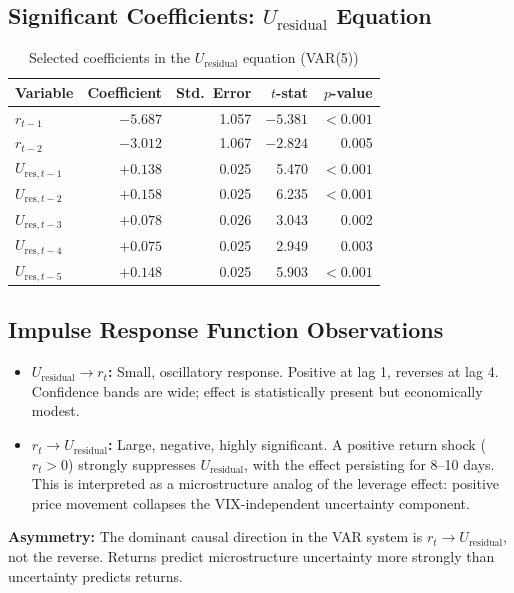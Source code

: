 \documentclass[preprint,12pt]{elsarticle}
\begin{document}
\subsection{Significant Coefficients: \texorpdfstring{$U_\mathrm{residual}$}{U\_residual} Equation}

\begin{table}[htbp]
\centering
\caption{Selected coefficients in the $U_\mathrm{residual}$ equation (VAR(5))}
\begin{tabular}{lrrrr}
\toprule
Variable & Coefficient & Std.\ Error & $t$-stat & $p$-value \\
\midrule
$r_{t-1}$ & $-5.687$ & 1.057 & $-5.381$ & $<0.001$ \\
$r_{t-2}$ & $-3.012$ & 1.067 & $-2.824$ & 0.005 \\
$U_{\mathrm{res}, t-1}$ & $+0.138$ & 0.025 & 5.470 & $<0.001$ \\
$U_{\mathrm{res}, t-2}$ & $+0.158$ & 0.025 & 6.235 & $<0.001$ \\
$U_{\mathrm{res}, t-3}$ & $+0.078$ & 0.026 & 3.043 & 0.002 \\
$U_{\mathrm{res}, t-4}$ & $+0.075$ & 0.025 & 2.949 & 0.003 \\
$U_{\mathrm{res}, t-5}$ & $+0.148$ & 0.025 & 5.903 & $<0.001$ \\
\bottomrule
\end{tabular}
\end{table}

\subsection{Impulse Response Function Observations}

\begin{itemize}
    \item \textbf{$U_\mathrm{residual} \to r_t$:} Small, oscillatory response. Positive at lag 1, reverses at lag 4. Confidence bands are wide; effect is statistically present but economically modest.
    \item \textbf{$r_t \to U_\mathrm{residual}$:} Large, negative, highly significant. A positive return shock ($r_t > 0$) strongly suppresses $U_\mathrm{residual}$, with the effect persisting for 8--10 days. This is interpreted as a microstructure analog of the leverage effect: positive price movement collapses the VIX-independent uncertainty component.
\end{itemize}

\textbf{Asymmetry:} The dominant causal direction in the VAR system is $r_t \to U_\mathrm{residual}$, not the reverse. Returns predict microstructure uncertainty more strongly than uncertainty predicts returns.
\end{document}
